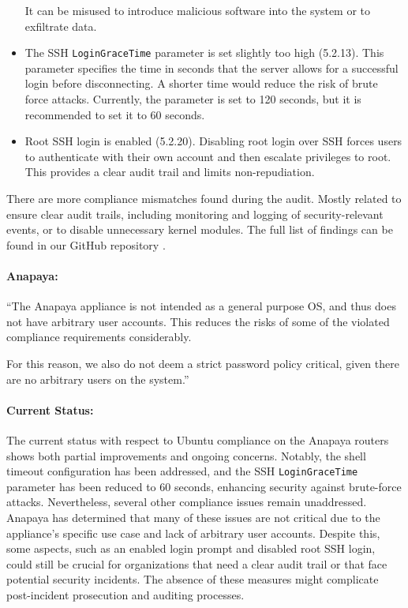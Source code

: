 \begin{itemize}
    It can be misused to introduce malicious software into the system or to exfiltrate data.
    \item The SSH \texttt{LoginGraceTime} parameter is set slightly too high (5.2.13).
    This parameter specifies the time in seconds that the server allows for a successful login before disconnecting.
    A shorter time would reduce the risk of brute force attacks.
    Currently, the parameter is set to 120 seconds, but it is recommended to set it to 60 seconds.
    \item Root SSH login is enabled (5.2.20).
    Disabling root login over SSH forces users to authenticate with their own account and then escalate privileges to root.
    This provides a clear audit trail and limits non-repudiation.
\end{itemize}


There are more compliance mismatches found during the audit.
Mostly related to ensure clear audit trails, including monitoring and logging of security-relevant events, or to disable unnecessary kernel modules.
The full list of findings can be found in our GitHub repository \cite{gitHubMseewerMasterThesis}.


\begin{boxH}
\paragraph{Anapaya:}
``The Anapaya appliance is not intended as a general purpose OS, and thus does not have arbitrary user accounts. This reduces the risks of some of the violated compliance requirements considerably.

For this reason, we also do not deem a strict password policy critical, given there are no arbitrary users on the system.''
\end{boxH}


\paragraph{Current Status:}
The current status with respect to Ubuntu compliance on the Anapaya routers shows both partial improvements and ongoing concerns.
Notably, the shell timeout configuration has been addressed, and the SSH \texttt{LoginGraceTime} parameter has been reduced to 60 seconds, enhancing security against brute-force attacks.
Nevertheless, several other compliance issues remain unaddressed.
Anapaya has determined that many of these issues are not critical due to the appliance's specific use case and lack of arbitrary user accounts.
Despite this, some aspects, such as an enabled login prompt and disabled root SSH login, could still be crucial for organizations that need a clear audit trail or that face potential security incidents.
The absence of these measures might complicate post-incident prosecution and auditing processes.

